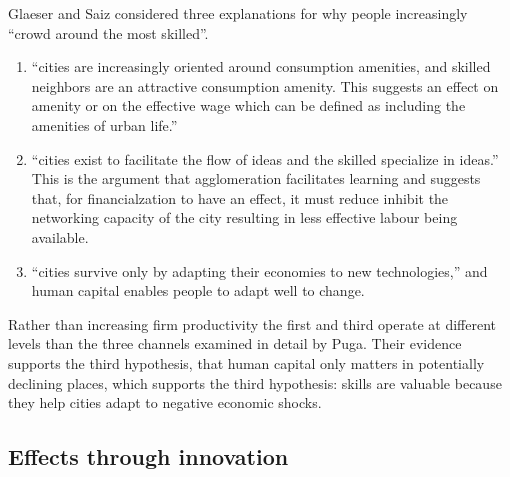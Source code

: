 Glaeser and Saiz \cite{glaeserRiseSkilledCity2003} considered three explanations for why people increasingly ``crowd around the most skilled''. 
\begin {enumerate} 
\item ``cities are increasingly oriented around consumption amenities, and skilled neighbors are an attractive consumption amenity. This suggests an effect on amenity or on the effective wage which can be defined as  including the  amenities of urban life.'' 
\item  ``cities exist to facilitate the flow of ideas and the skilled specialize in ideas.'' This is the argument that agglomeration facilitates learning and suggests that, for financialzation to have an effect, it must reduce inhibit the networking capacity of  the city resulting in less effective labour being available.
\item ``cities survive only by adapting their economies to new technologies,'' and human capital enables people to adapt well to change. 
\end{enumerate}
Rather than increasing firm productivity the first and third operate at  different levels than the three channels examined in detail by Puga. 
Their evidence supports the third hypothesis, that human capital only matters in potentially declining places, which  supports the third hypothesis: skills are valuable because they help cities adapt  to negative economic shocks. 


\subsection{Effects through innovation}








